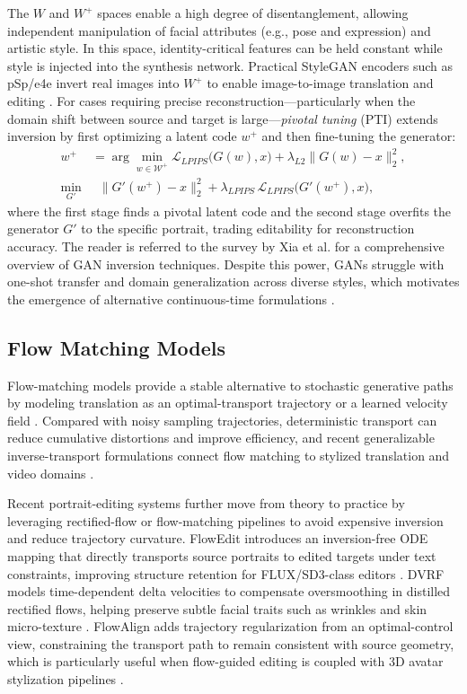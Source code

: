 \documentclass[journal]{IEEEtran}
\begin{document}
The $W$ and $W^+$ spaces enable a high degree of disentanglement, allowing independent manipulation of facial attributes (e.g., pose and expression) and artistic style. In this space, identity-critical features can be held constant while style is injected into the synthesis network. Practical StyleGAN encoders such as pSp/e4e invert real images into $W^+$ to enable image-to-image translation and editing \cite{richardson2021encoding}. For cases requiring precise reconstruction---particularly when the domain shift between source and target is large---\emph{pivotal tuning} (PTI) \cite{roich2022pivotal} extends inversion by first optimizing a latent code $w^+$ and then fine-tuning the generator:
\begin{align}
w^+ &= \arg\min_{w \in \mathcal{W}^+} \mathcal{L}_{LPIPS}\bigl(G(w), x\bigr) + \lambda_{L2}\lVert G(w) - x \rVert_2^2, \\
\min_{G'} &\;\; \lVert G'(w^+) - x \rVert_2^2 + \lambda_{LPIPS}\,\mathcal{L}_{LPIPS}\bigl(G'(w^+), x\bigr),
\end{align}
where the first stage finds a pivotal latent code and the second stage overfits the generator $G'$ to the specific portrait, trading editability for reconstruction accuracy. The reader is referred to the survey by Xia et al. \cite{xia2023gan} for a comprehensive overview of GAN inversion techniques. Despite this power, GANs struggle with one-shot transfer and domain generalization across diverse styles, which motivates the emergence of alternative continuous-time formulations \cite{karras2019style}.

\subsection{Flow Matching Models}
\label{sec:foundations:flow}
\label{sec:theory:flowmatching}
Flow-matching models provide a stable alternative to stochastic generative paths by modeling translation as an optimal-transport trajectory or a learned velocity field \cite{lipman2023flow}. Compared with noisy sampling trajectories, deterministic transport can reduce cumulative distortions and improve efficiency, and recent generalizable inverse-transport formulations connect flow matching to stylized translation and video domains \cite{cheng2023generalit,yang2023rerender}.

Recent portrait-editing systems further move from theory to practice by leveraging rectified-flow or flow-matching pipelines to avoid expensive inversion and reduce trajectory curvature. FlowEdit introduces an inversion-free ODE mapping that directly transports source portraits to edited targets under text constraints, improving structure retention for FLUX/SD3-class editors \cite{flowedit2025}. DVRF models time-dependent delta velocities to compensate oversmoothing in distilled rectified flows, helping preserve subtle facial traits such as wrinkles and skin micro-texture \cite{dvrf2025}. FlowAlign adds trajectory regularization from an optimal-control view, constraining the transport path to remain consistent with source geometry, which is particularly useful when flow-guided editing is coupled with 3D avatar stylization pipelines \cite{flowalign2025}.
\end{document}
